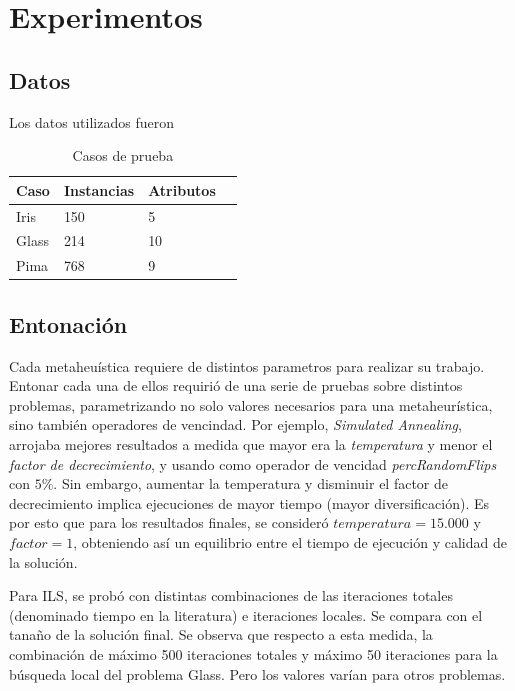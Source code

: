 \documentclass[11pt]{article}
\begin{document}
\section{Experimentos}

\subsection{Datos}

Los datos utilizados fueron

\begin{table}[h]
\begin{tabular}{ |l|l|l|l| }
    \hline
    Caso    & Instancias & Atributos \\ \hline
    Iris & 150 & 5 \\ \hline
    Glass & 214 & 10 \\ \hline
    Pima & 768 & 9 \\ \hline
\end{tabular}
\caption{Casos de prueba}
\label{tabla:1}
\end{table}

\subsection{Entonación}

Cada metaheuística requiere de distintos parametros para realizar
su trabajo. Entonar cada una de ellos requirió de una serie 
de pruebas sobre distintos problemas, parametrizando
no solo valores necesarios para una metaheurística, sino también operadores de vencindad. 
Por ejemplo, \emph{Simulated Annealing}, arrojaba mejores 
resultados a medida que mayor era la \emph{temperatura} y menor el \emph{factor de decrecimiento},
y usando como operador de vencidad \emph{percRandomFlips} con $5\%$. Sin embargo,
aumentar la temperatura y disminuir el factor de decrecimiento implica ejecuciones 
de mayor tiempo (mayor
diversificación). Es por esto que para los resultados finales, se consideró $temperatura = 15.000$ 
y $factor = 1$, obteniendo así un equilibrio entre el tiempo de ejecución y calidad de la solución. 


Para ILS, se probó con distintas combinaciones de las iteraciones totales (denominado tiempo en la literatura) e iteraciones locales. Se compara con el tanaño de la solución final. Se observa que respecto a esta medida, la combinación de máximo 500 iteraciones totales y máximo 50 iteraciones para la búsqueda local del problema Glass. Pero los valores varían para otros problemas.
\end{document}
